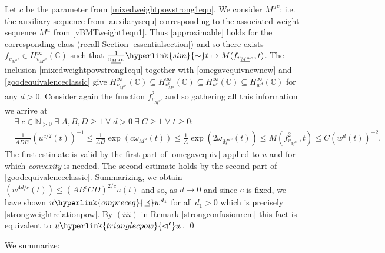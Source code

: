 \documentclass[10pt]{amsart}%
\numberwithin{equation}{section}
\theoremstyle{plain}
\newcommand{\CC}{\mathbb{C}}
\newcommand{\NN}{\mathbb{N}}
\begin{document}
Let $c$ be the parameter from \eqref{mixedweightpowstrong1equ}. We consider $\underline{M^u}^c$; i.e. the auxiliary sequence from \eqref{auxilarysequ} corresponding to the associated weight sequence $M^u$ from \eqref{vBMTweight1equ1}. Thus \eqref{approximable} holds for the corresponding class (recall Section \ref{essentialsection}) and so there exists $f_{v_{\underline{M^u}^c}}\in H^{\infty}_{v_{\underline{M^u}^c}}(\CC)$ such that $\frac{1}{v_{\underline{M^u}^c}}\hyperlink{sim}{\sim} t\mapsto M(f_{v_{\underline{M^u}^c}},t)$. The inclusion \eqref{mixedweightpowstrong1equ} together with \eqref{omegavequivnewnew} and \eqref{goodequivalenceclassic} give $H^{\infty}_{v_{\underline{M^u}^c}}(\CC)\subseteq H^{\infty}_{v^c_{M^u}}(\CC)\subseteq H^{\infty}_{u^c}(\CC)\subseteq H^{\infty}_{w^d}(\CC)$ for any $d>0$. Consider again the function $f^2_{v_{\underline{M^u}^c}}$ and so gathering all this information we arrive at
\begin{align*}
	&\exists\;c\in\NN_{>0}\;\exists\;A,B,D\ge 1\;\forall\;d>0\;\exists\;C\ge 1\;\forall\;t\ge 0:
	\\&
	\frac{1}{ADB^c}(u^{c/2}(t))^{-1}\le\frac{1}{AD}\exp(c\omega_{M^u}(t))\le\frac{1}{A}\exp(2\omega_{\underline{M^u}^c}(t))\le  M(f^2_{v_{\underline{M^u}^c}},t)\le C(w^d(t))^{-2}.
\end{align*}
The first estimate is valid by the first part of \eqref{omegavequiv} applied to $u$ and for which {\itshape convexity} is needed. The second estimate holds by the second part of \eqref{goodequivalenceclassic}. Summarizing, we obtain $(w^{4d/c}(t))\le(AB^cCD)^{2/c}u(t)$ and so, as $d\rightarrow 0$ and since $c$ is fixed, we have shown $u\hyperlink{ompreceq}{\preceq}w^{d_1}$ for all $d_1>0$ which is precisely \eqref{strongweightrelationpow}. By $(iii)$ in Remark \ref{strongconfusionrem} this fact is equivalent to $u\hyperlink{trianglecpow}{\vartriangleleft^{\mathfrak{c}}}w$.
\qed\enddemo

We summarize:
\end{document}
